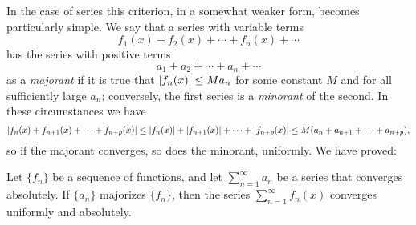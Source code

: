 In the case of series this criterion, in a somewhat weaker form, becomes particularly simple. We say that a series with variable terms $$f_1(x)+f_2(x)+\cdots+f_n(x)+\cdots$$ has the series with positive terms $$a_1+a_2+\cdots+a_n+\cdots$$ as a \emph{majorant} if it is true that $\lvert f_n(x) \rvert \le Ma_n$ for some constant $M$ and for all sufficiently large $a_n$; conversely, the first series is a \emph{minorant} of the second. In these circumstances we have $$\lvert f_n(x)+f_{n+1}(x)+\cdots+f_{n+p}(x) \rvert \le \lvert f_n(x) \rvert+\lvert f_{n+1}(x) \rvert+\cdots+\lvert f_{n+p}(x) \rvert \le M(a_n+a_{n+1}+\cdots+a_{n+p}),$$ so if the majorant converges, so does the minorant, uniformly. We have proved:
\begin{proposition}
	Let $\{f_n\}$ be a sequence of functions, and let $\sum_{n=1}^{\infty}a_n$ be a series that converges absolutely. If $\{a_n\}$ majorizes $\{f_n\}$, then the series $\sum_{n=1}^{\infty}f_n(x)$ converges uniformly and absolutely.
\end{proposition}

